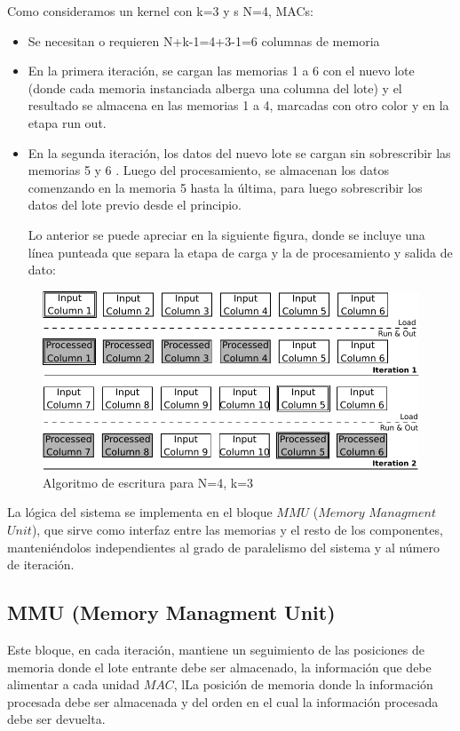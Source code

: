 \documentclass[a4paper]{article}
\begin{document}
Como consideramos un kernel con k=3 y s N=4, MACs:
\begin{frame}{}
	    
      \begin{itemize}
        \item Se necesitan o requieren N+k-1=4+3-1=6 columnas de memoria
	\item En la primera iteración, se cargan las memorias 1 a 6 con el nuevo lote (donde cada memoria instanciada alberga una columna del lote) y el resultado se almacena en las memorias 1 a 4, marcadas con otro color y en la etapa run  out.
	\item En la segunda iteración, los datos del nuevo lote se cargan sin sobrescribir las memorias 5 y 6 . Luego del procesamiento, se almacenan los datos comenzando en la memoria  5 hasta la última, para luego sobrescribir los datos del lote previo desde el principio.

\bigskip
\bigskip
Lo anterior se puede apreciar en la siguiente figura, donde se incluye una línea punteada que separa la etapa de carga y la de procesamiento y salida de dato:

\end{itemize}
\end{frame}

\begin{figure}[H]
\centering
\includegraphics[scale=0.8]{algorithm}
\caption{Algoritmo de escritura para N=4, k=3 }
\label{writingprocess}
\end{figure}


La lógica del sistema se implementa en el bloque $MMU$ ($Memory$ $Managment$ $Unit$), que sirve como interfaz entre las memorias y el resto de los componentes, 
manteniéndolos independientes al grado de paralelismo del sistema y al número de iteración.

\bigskip

\subsection {MMU (Memory Managment Unit) }  \label{mmu_subsecc}
Este bloque, en cada iteración, mantiene un seguimiento de las posiciones de memoria donde el lote entrante debe ser almacenado,
la información que debe alimentar a cada unidad $MAC$, lLa posición de memoria donde la información procesada debe ser almacenada
y del orden en el cual la información procesada debe ser devuelta.
\end{document}
